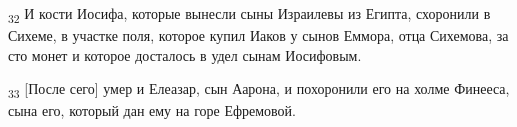 \begin{tcolorbox}
\textsubscript{32} И кости Иосифа, которые вынесли сыны Израилевы из Египта, схоронили в Сихеме, в участке поля, которое купил Иаков у сынов Еммора, отца Сихемова, за сто монет и которое досталось в удел сынам Иосифовым.
\end{tcolorbox}
\begin{tcolorbox}
\textsubscript{33} [После сего] умер и Елеазар, сын Аарона, и похоронили его на холме Финееса, сына его, который дан ему на горе Ефремовой.
\end{tcolorbox}
